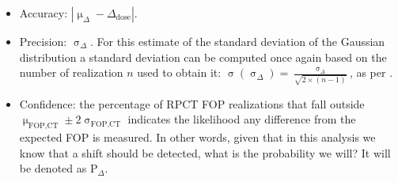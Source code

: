 \documentclass[a4paper,english]{article}
\begin{document}
\begin{itemize}[noitemsep]
\item Accuracy: $| \upmu_{\Delta} - \Delta_\textrm{dose}|$.
\item Precision: $\upsigma_\Delta$. For this estimate of the standard deviation of the Gaussian distribution a standard deviation can be computed once again based on the number of realization $n$ used to obtain it: $\upsigma(\upsigma_\Delta)=\frac{\upsigma_\Delta}{\sqrt{2\times(n-1)}}$, as per \citet[formula 4.54]{Leo1994}.
\item Confidence: the percentage of RPCT FOP realizations that fall outside $\upmu_\textrm{FOP,CT}\pm2\upsigma_\textrm{FOP,CT}$ indicates the likelihood any difference from the expected FOP is measured. In other words, given that in this analysis we know that a shift should be detected, what is the probability we will? It will be denoted as P$_\Delta$.



\end{itemize}
\end{document}
